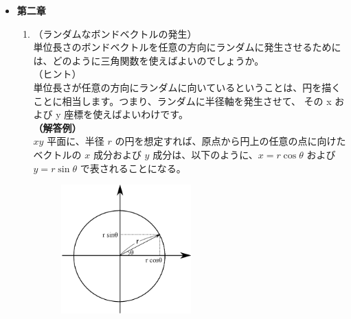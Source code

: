 \documentclass[11pt]{jsarticle}
\begin{document}
\begin{itemize}
\begin{enumerate}
	{\bf（解答例）}\\
	活性化エネルギーに対応するエネルギー障壁を乗り越えて状態が遷移していく過程の頻度は、
	系中に存在する粒子の中でその障壁に対応するエネルギーを持っている粒子の存在比率を考えればよいことになる。

	本設問の場合は、基本的な回転振動数（時間の逆数）が与えられているのであるから、系が注目する状態から他の状態（今回の場合は、トランス状態からゴーシュ状態）に遷移する
	緩和時間 $\tau$ の逆数の形で書き下すことができる。
		\begin{align*}
			\dfrac{1}{\tau}
			&= 10^{12} \times \exp \left( -\dfrac{\Delta E}{k_B T} \right) \notag \\[6pt]
			&= 10^{12} \times \exp \left( -\dfrac{15 \times 10^3 {\rm J mol}^{-1} }{1.4 \times 10^{-23} {\rm J K}^{-1} \times 6.02 \times 10^{23} 
			\times 300 {\rm K} } \right) \notag \\[6pt] 
			&\simeq 10^{12} \times \exp \left( -6 \right)\notag \\[6pt]
			&= 10^{12} \times 2.5 \times 10^{-3}\notag \\[6pt]
			&\simeq 10^{9}
			\end{align*}

	したがって、オーダーでみれば、三桁程度頻度が低下するという結論を得ることができる。

	\end{enumerate}

\item
{\bf 第二章}

	\begin{enumerate}
	\item
	\label{it:3-1}
	（ランダムなボンドベクトルの発生）\\
	単位長さのボンドベクトルを任意の方向にランダムに発生させるためには、どのように三角関数を使えばよいのでしょうか。\\
	（ヒント）\\
	単位長さが任意の方向にランダムに向いているということは、円を描くことに相当します。つまり、ランダムに半径軸を発生させて、
	その x および y 座標を使えばよいわけです。\\
	{\bf（解答例）}\\
	$xy$ 平面に、半径 $r$ の円を想定すれば、原点から円上の任意の点に向けたベクトルの $x$ 成分および $y$ 成分は、以下のように、$x = r \cos \theta$ 
	および $y= r \sin \theta$ で表されることになる。
		\begin{figure}[htb]
		\centering
		\includegraphics[width=5cm]{figure/sin_cos.eps}
		\end{figure}


\end{enumerate}
\end{itemize}
\end{document}
